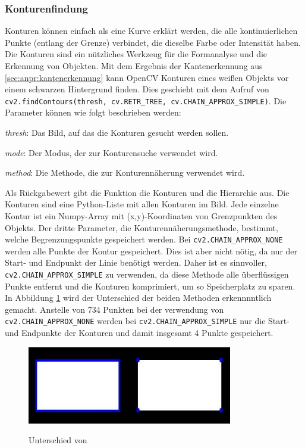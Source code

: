 \subsubsection{Konturenfindung}
Konturen können einfach als eine Kurve erklärt werden, die alle kontinuierlichen Punkte (entlang der Grenze) verbindet, die dieselbe Farbe oder Intensität haben. Die Konturen sind ein nützliches Werkzeug für die Formanalyse und die Erkennung von Objekten.
Mit dem Ergebnis der Kantenerkennung aus \ref{sec:anpr:kantenerkennung} kann OpenCV Konturen eines weißen Objekts vor einem schwarzen Hintergrund finden. Dies geschieht mit dem Aufruf von \verb|cv2.findContours(thresh, cv.RETR_TREE, cv.CHAIN_APPROX_SIMPLE)|. Die Parameter können wie folgt beschrieben werden:
\begin{compactenum}
    \item \textit{thresh}: Das Bild, auf das die Konturen gesucht werden sollen.
    \item \textit{mode}: Der Modus, der zur Konturensuche verwendet wird.
    \item \textit{method}: Die Methode, die zur Konturennäherung verwendet wird.
\end{compactenum}
Als Rückgabewert gibt die Funktion die Konturen und die Hierarchie aus. Die Konturen sind eine Python-Liste mit allen Konturen im Bild. Jede einzelne Kontur ist ein Numpy-Array mit (x,y)-Koordinaten von Grenzpunkten des Objekts.
Der dritte Parameter, die Konturennäherungsmethode, bestimmt, welche Begrenzungspunkte gespeichert werden. Bei \verb|cv2.CHAIN_APPROX_NONE| werden alle Punkte der Kontur gespeichert. Dies ist aber nicht nötig, da nur der Start- und Endpunkt der Linie benötigt werden. Daher ist es sinnvoller, \verb|cv2.CHAIN_APPROX_SIMPLE| zu verwenden, da diese Methode alle überflüssigen Punkte entfernt und die Konturen komprimiert, um so Speicherplatz zu sparen.
In Abbildung \ref{fig:anpr:contour:cam} wird der Unterschied der beiden Methoden erkennnntlich gemacht. Anstelle von 734 Punkten bei der verwendung von \verb|cv2.CHAIN_APPROX_NONE| werden bei \verb|cv2.CHAIN_APPROX_SIMPLE| nur die Start- und Endpunkte der Konturen und damit insgesamt 4 Punkte gespeichert.\cite{drawContours}
\begin{figure}[H]
    \centering
    \includegraphics[width=0.8\textwidth]{pics/none.jpg}
    \caption{Unterschied von}
    \cite{CAMPic}
    \label{fig:anpr:contour:cam}
    \end{figure}
